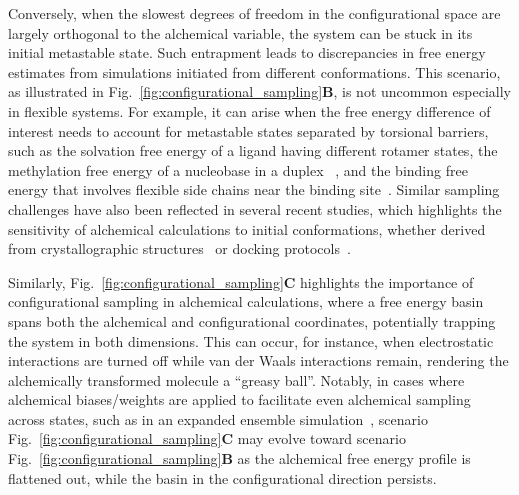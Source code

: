 \documentclass[9pt,bestpractices,pubversion]{livecoms}
\begin{document}
Conversely, when the slowest degrees of freedom in the configurational space are largely orthogonal to the alchemical variable, the system can be stuck in its initial metastable state. Such entrapment leads to discrepancies in free energy estimates from simulations initiated from different conformations. This scenario, as illustrated in Fig.~\ref{fig:configurational_sampling}\textbf{B}, is not uncommon especially in flexible systems. For example, it can arise when the free energy difference of interest needs to account for metastable states separated by torsional barriers, such as the solvation free energy of a ligand having different rotamer states, the methylation free energy of a nucleobase in a duplex ~\cite{hsu2023alchemical}, and the binding free energy that involves flexible side chains near the binding site~\cite{la2022alchemical}. Similar sampling challenges have also been reflected in several recent studies, which highlights the sensitivity of alchemical calculations to initial conformations, whether derived from crystallographic structures~\cite{suruzhon2021sensitivity, baumann2024impact} or docking protocols~\cite{cappel2020impact}. 

Similarly, Fig.~\ref{fig:configurational_sampling}\textbf{C} highlights the importance of configurational sampling in alchemical calculations, where a free energy basin spans both the alchemical and configurational coordinates, potentially trapping the system in both dimensions. This can occur, for instance, when electrostatic interactions are turned off while van der Waals interactions remain, rendering the alchemically transformed molecule a ``greasy ball''. Notably, in cases where alchemical biases/weights are applied to facilitate even alchemical sampling across states, such as in an expanded ensemble simulation~\cite{lyubartsev1992new}, scenario Fig.~\ref{fig:configurational_sampling}\textbf{C} may evolve toward scenario Fig.~\ref{fig:configurational_sampling}\textbf{B} as the alchemical free energy profile is flattened out, while the basin in the configurational direction persists. 
\end{document}
